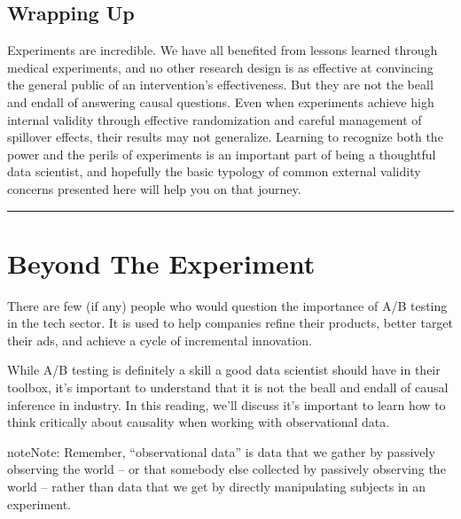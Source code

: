 \documentclass[letterpaper,10pt,english]{jupyterBook}
\begin{document}
\section{Wrapping Up}
\label{\detokenize{30_questions/45_causal_questions_external:wrapping-up}}
\sphinxAtStartPar
Experiments are incredible. We have all benefited from lessons learned through medical experiments, and no other research design is as effective at convincing the general public of an intervention’s effectiveness. But they are not the be\sphinxhyphen{}all and end\sphinxhyphen{}all of answering causal questions. Even when experiments achieve high internal validity through effective randomization and careful management of spillover effects, their results may not generalize. Learning to recognize both the power and the perils of experiments is an important part of being a thoughtful data scientist, and hopefully the basic typology of common external validity concerns presented here will help you on that journey.


\bigskip\hrule\bigskip


\sphinxstepscope


\chapter{Beyond The Experiment}
\label{\detokenize{30_questions/50_causal_beyond_ab:beyond-the-experiment}}\label{\detokenize{30_questions/50_causal_beyond_ab::doc}}
\sphinxAtStartPar
{}

\sphinxAtStartPar
There are few (if any) people who would question the importance of A/B testing in the tech sector. It is used  to help companies refine their products, better target their ads, and achieve a cycle of incremental innovation.

\sphinxAtStartPar
While A/B testing is definitely a skill a good data scientist should have in their toolbox, it’s important to understand that it is not the be\sphinxhyphen{}all and end\sphinxhyphen{}all of causal inference in industry. In this reading, we’ll discuss  it’s important to learn how to think critically about causality when working with observational data.

\begin{sphinxadmonition}{note}{Note:}
\sphinxAtStartPar
Remember, “observational data” is data that we gather by passively observing the world – or that somebody else collected by passively observing the world – rather than data that we get by directly manipulating subjects in an experiment.
\end{sphinxadmonition}
\end{document}
